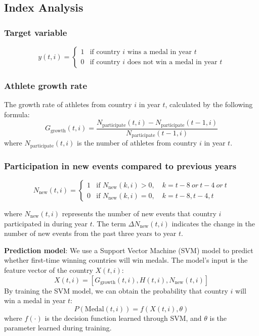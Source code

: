 \documentclass{mcmthesis}
\begin{document}
\subsection{Index Analysis}


\subsubsection{Target variable}
\[
y(t,i) = 
\begin{cases} 
	1 & \text{if country } i \text{ wins a medal in year } t \\ 
	0 & \text{if country } i \text{ does not win a medal in year } t 
\end{cases}
\]
\subsubsection{Athlete growth rate}
The growth rate of athletes from country $i$ in year $t$, calculated by the following formula:
\[
G_{\text{growth}}(t,i) = \frac{N_{\text{participate}}(t,i) - N_{\text{participate}}(t-1,i)}{N_{\text{participate}}(t-1,i)}
\]
where $N_{\text{participate}}(t,i)$ is the number of athletes from country $i$ in year $t$.


\subsubsection{Participation in new events compared to previous years} 
\[
N_{\text{new}}(t,i) =
\begin{cases}
	1 & \text{if } N_{\text{new}}(k,i) > 0, \quad k = t-8\ or\ t-4\ or\ t \\
	0 & \text{if } N_{\text{new}}(k,i) = 0, \quad k = t-8, t-4, t
\end{cases}
\]

where $N_{\text{new}}(t,i)$ represents the number of new events that country $i$ participated in during year $t$. The term $\Delta N_{\text{new}}(t,i)$ indicates the change in the number of new events from the past three years to year $t$.





\textbf{Prediction model}:
We use a Support Vector Machine (SVM) model to predict whether first-time winning countries will win medals. The model’s input is the feature vector of the country $X(t,i)$:
\[
X(t,i) = [G_{\text{growth}}(t,i), H(t,i), N_{\text{new}}(t,i)]
\]
By training the SVM model, we can obtain the probability that country $i$ will win a medal in year $t$:
\[
P(\text{Medal}(t,i)) = f(X(t,i), \theta)
\]
where $f(\cdot)$ is the decision function learned through SVM, and $\theta$ is the parameter learned during training.
\end{document}
